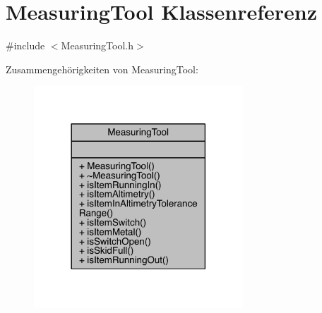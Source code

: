 \hypertarget{class_measuring_tool}{}\section{Measuring\+Tool Klassenreferenz}
\label{class_measuring_tool}


{\ttfamily \#include $<$Measuring\+Tool.\+h$>$}



Zusammengehörigkeiten von Measuring\+Tool\+:\nopagebreak
\begin{figure}[H]
\begin{center}
\leavevmode
\includegraphics[width=222pt]{class_measuring_tool__coll__graph}
\end{center}
\end{figure}
